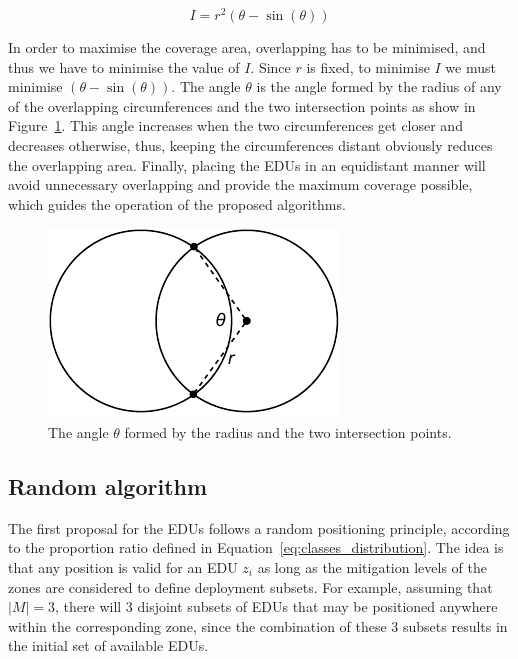 \begin{refsection}
\begin{equation}
  I = r^2(\theta - \sin(\theta))
  \label{eq:overlapping_area}
\end{equation}

In order to maximise the coverage area, overlapping has to be minimised, and thus we have to minimise the value of $I$. Since $r$ is fixed, to minimise $I$ we must minimise $(\theta - \sin(\theta))$. The angle $\theta$ is the angle formed by the radius of any of the overlapping circumferences and the two intersection points as show in Figure~\ref{fig:circle_intersection}. This angle increases when the two circumferences get closer and decreases otherwise, thus, keeping the circumferences distant obviously reduces the overlapping area. Finally, placing the EDUs in an equidistant manner will avoid unnecessary overlapping and provide the maximum coverage possible, which guides the operation of the proposed algorithms.

\begin{figure}[htbp]
  \centering
  \includegraphics{Chapters/3-EDUs/images/circumferences_overlapping.pdf}
  \caption{The angle $\theta$ formed by the radius and the two intersection points.}\label{fig:circle_intersection}
\end{figure}

\subsection{Random algorithm}

The first proposal for the EDUs follows a random positioning principle, according to the proportion ratio defined in Equation~\ref{eq:classes_distribution}. The idea is that any position is valid for an EDU $z_i$ as long as the mitigation levels of the zones are considered to define deployment subsets. For example, assuming that $|M|=3$, there will 3 disjoint subsets of EDUs that may be positioned anywhere within the corresponding zone, since the combination of these 3 subsets results in the initial set of available EDUs.


\end{refsection}
